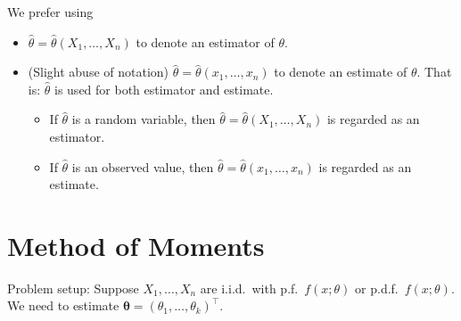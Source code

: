 \begin{Remark}{}{}
      We prefer using
      \begin{itemize}
            \item $ \hat{\theta}=\hat{\theta}(X_1,\ldots,X_n) $
                  to denote an estimator of $ \theta $.
            \item (Slight abuse of notation)
                  $ \hat{\theta}=\hat{\theta}(x_1,\ldots,x_n) $
                  to denote an estimate of $ \theta $. That is:
                  $ \hat{\theta} $ is used for both estimator and estimate.
                  \begin{itemize}
                        \item If $ \hat{\theta} $ is a random variable, then
                              $ \hat{\theta}=\hat{\theta}(X_1,\ldots,X_n) $
                              is regarded as an estimator.
                        \item If $ \hat{\theta} $ is an observed value, then
                              $ \hat{\theta}=\hat{\theta}(x_1,\ldots,x_n) $
                              is regarded as an estimate.
                  \end{itemize}
      \end{itemize}
\end{Remark}
\section{Method of Moments}
Problem setup: Suppose $ X_1,\ldots,X_n $
are i.i.d.\ with p.f.\ $ f(x;\theta) $
or p.d.f.\ $ f(x;\theta) $. We need to estimate
$ \symbf{\theta}=(\theta_1,\ldots,\theta_k)^\top $.


